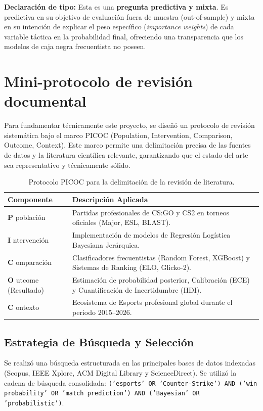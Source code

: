 \documentclass[12pt,a4paper]{article}
\begin{document}
\vspace{1em}
\noindent \textbf{Declaración de tipo:} Esta es una \textbf{pregunta predictiva y mixta}. Es predictiva en su objetivo de evaluación fuera de muestra (out-of-sample) y mixta en su intención de explicar el peso específico (\textit{importance weights}) de cada variable táctica en la probabilidad final, ofreciendo una transparencia que los modelos de caja negra frecuentista no poseen.

\section{Mini-protocolo de revisión documental}

Para fundamentar técnicamente este proyecto, se diseñó un protocolo de revisión sistemática bajo el marco PICOC (Population, Intervention, Comparison, Outcome, Context). Este marco permite una delimitación precisa de las fuentes de datos y la literatura científica relevante, garantizando que el estado del arte sea representativo y técnicamente sólido.

\begin{table}[h!]
\centering
\begin{tabular}{|l|p{10cm}|}
\hline
\textbf{Componente} & \textbf{Descripción Aplicada} \\ \hline
\textbf{P} población & Partidas profesionales de CS:GO y CS2 en torneos oficiales (Major, ESL, BLAST). \\ \hline
\textbf{I} ntervención & Implementación de modelos de Regresión Logística Bayesiana Jerárquica. \\ \hline
\textbf{C} omparación & Clasificadores frecuentistas (Random Forest, XGBoost) y Sistemas de Ranking (ELO, Glicko-2). \\ \hline
\textbf{O} utcome (Resultado) & Estimación de probabilidad posterior, Calibración (ECE) y Cuantificación de Incertidumbre (HDI). \\ \hline
\textbf{C} ontexto & Ecosistema de Esports profesional global durante el periodo 2015--2026. \\ \hline
\end{tabular}
\caption{Protocolo PICOC para la delimitación de la revisión de literatura.}
\label{tab:picoc}
\end{table}

\subsection{Estrategia de Búsqueda y Selección}
Se realizó una búsqueda estructurada en las principales bases de datos indexadas (Scopus, IEEE Xplore, ACM Digital Library y ScienceDirect). Se utilizó la cadena de búsqueda consolidada: \texttt{('esports' OR 'Counter-Strike') AND ('win probability' OR 'match prediction') AND ('Bayesian' OR 'probabilistic')}.
\end{document}
